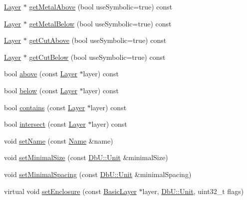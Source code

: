 \begin{DoxyCompactItemize}
\mbox{\hyperlink{classHurricane_1_1Layer}{Layer}} $\ast$ \mbox{\hyperlink{classHurricane_1_1Layer_ac32eff2dc51180660fe9b4ce17cae42c}{get\+Metal\+Above}} (bool use\+Symbolic=true) const
\item 
\mbox{\hyperlink{classHurricane_1_1Layer}{Layer}} $\ast$ \mbox{\hyperlink{classHurricane_1_1Layer_a4bc8358f67c1a1a9b2581e4b3732108c}{get\+Metal\+Below}} (bool use\+Symbolic=true) const
\item 
\mbox{\hyperlink{classHurricane_1_1Layer}{Layer}} $\ast$ \mbox{\hyperlink{classHurricane_1_1Layer_ad9fca94fed1837e3e80e9b6445822b7d}{get\+Cut\+Above}} (bool use\+Symbolic=true) const
\item 
\mbox{\hyperlink{classHurricane_1_1Layer}{Layer}} $\ast$ \mbox{\hyperlink{classHurricane_1_1Layer_a983956c8127688390f978cc5bd0d768d}{get\+Cut\+Below}} (bool use\+Symbolic=true) const
\item 
bool \mbox{\hyperlink{classHurricane_1_1Layer_abbd13bf66cf75dd6445d0353987119f3}{above}} (const \mbox{\hyperlink{classHurricane_1_1Layer}{Layer}} $\ast$layer) const
\item 
bool \mbox{\hyperlink{classHurricane_1_1Layer_a090f8697946f721351a626052af25027}{below}} (const \mbox{\hyperlink{classHurricane_1_1Layer}{Layer}} $\ast$layer) const
\item 
bool \mbox{\hyperlink{classHurricane_1_1Layer_af63dd0a48e2a3514a1cdaccd4586bad8}{contains}} (const \mbox{\hyperlink{classHurricane_1_1Layer}{Layer}} $\ast$layer) const
\item 
bool \mbox{\hyperlink{classHurricane_1_1Layer_adbea0bafaa87b033efdaa98bf2709182}{intersect}} (const \mbox{\hyperlink{classHurricane_1_1Layer}{Layer}} $\ast$layer) const
\item 
void \mbox{\hyperlink{classHurricane_1_1Layer_ab93809f19bc360f58d35e91438ef2f87}{set\+Name}} (const \mbox{\hyperlink{classHurricane_1_1Name}{Name}} \&name)
\item 
void \mbox{\hyperlink{classHurricane_1_1Layer_a400d17fe999c0080bb50489948986fe7}{set\+Minimal\+Size}} (const \mbox{\hyperlink{group__DbUGroup_ga4fbfa3e8c89347af76c9628ea06c4146}{Db\+U\+::\+Unit}} \&minimal\+Size)
\item 
void \mbox{\hyperlink{classHurricane_1_1Layer_a81a8a24526e8535fba5a35cdcc194a8f}{set\+Minimal\+Spacing}} (const \mbox{\hyperlink{group__DbUGroup_ga4fbfa3e8c89347af76c9628ea06c4146}{Db\+U\+::\+Unit}} \&minimal\+Spacing)
\item 
virtual void \mbox{\hyperlink{classHurricane_1_1Layer_a04e9c983525d074508d7e10107c1c3c7}{set\+Enclosure}} (const \mbox{\hyperlink{classHurricane_1_1BasicLayer}{Basic\+Layer}} $\ast$layer, \mbox{\hyperlink{group__DbUGroup_ga4fbfa3e8c89347af76c9628ea06c4146}{Db\+U\+::\+Unit}}, uint32\+\_\+t flags)

\end{DoxyCompactItemize}
